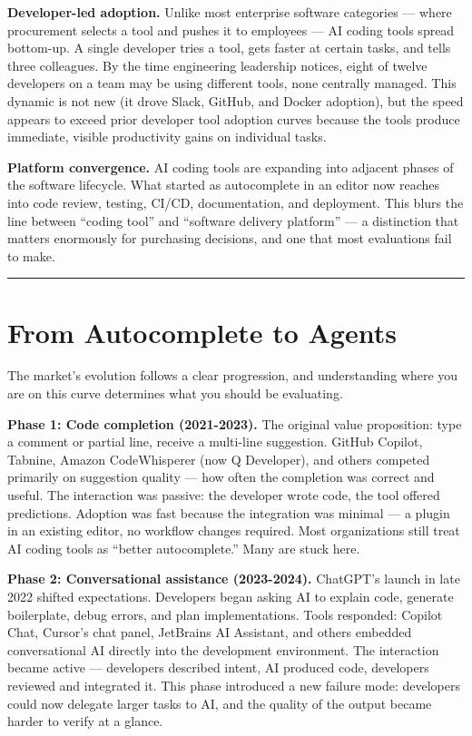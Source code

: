 \documentclass[
  a4paper,
  DIV=11,
  numbers=noendperiod]{scrreprt}
\newcounter{none} %
\begin{document}
\textbf{Developer-led adoption.} Unlike most enterprise software
categories --- where procurement selects a tool and pushes it to
employees --- AI coding tools spread bottom-up. A single developer tries
a tool, gets faster at certain tasks, and tells three colleagues. By the
time engineering leadership notices, eight of twelve developers on a
team may be using different tools, none centrally managed. This dynamic
is not new (it drove Slack, GitHub, and Docker adoption), but the speed
appears to exceed prior developer tool adoption curves because the tools
produce immediate, visible productivity gains on individual tasks.

\textbf{Platform convergence.} AI coding tools are expanding into
adjacent phases of the software lifecycle. What started as autocomplete
in an editor now reaches into code review, testing, CI/CD,
documentation, and deployment. This blurs the line between ``coding
tool'' and ``software delivery platform'' --- a distinction that matters
enormously for purchasing decisions, and one that most evaluations fail
to make.

\begin{center}\rule{0.5\linewidth}{0.5pt}\end{center}

\section{From Autocomplete to Agents}\label{from-autocomplete-to-agents}

The market's evolution follows a clear progression, and understanding
where you are on this curve determines what you should be evaluating.

\textbf{Phase 1: Code completion (2021-2023).} The original value
proposition: type a comment or partial line, receive a multi-line
suggestion. GitHub Copilot, Tabnine, Amazon CodeWhisperer (now Q
Developer), and others competed primarily on suggestion quality --- how
often the completion was correct and useful. The interaction was
passive: the developer wrote code, the tool offered predictions.
Adoption was fast because the integration was minimal --- a plugin in an
existing editor, no workflow changes required. Most organizations still
treat AI coding tools as ``better autocomplete.'' Many are stuck here.

\textbf{Phase 2: Conversational assistance (2023-2024).} ChatGPT's
launch in late 2022 shifted expectations. Developers began asking AI to
explain code, generate boilerplate, debug errors, and plan
implementations. Tools responded: Copilot Chat, Cursor's chat panel,
JetBrains AI Assistant, and others embedded conversational AI directly
into the development environment. The interaction became active ---
developers described intent, AI produced code, developers reviewed and
integrated it. This phase introduced a new failure mode: developers
could now delegate larger tasks to AI, and the quality of the output
became harder to verify at a glance.
\end{document}
